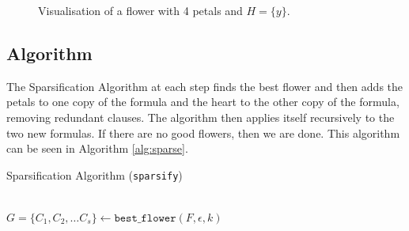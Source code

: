 \begin{figure}
    \centering
    \caption{Visualisation of a flower with 4 petals and $H = \{y\}$.}
    \label{fig:flower}
\end{figure}

\subsection{Algorithm}
The Sparsification Algorithm at each step finds the best flower and then adds
the petals to one copy of the formula and the heart to the other copy of the formula,
removing redundant clauses. The algorithm then applies itself recursively to the two
new formulas. If there are no good flowers, then we are done. This algorithm can
be seen in Algorithm \ref{alg:sparse}.

\begin{algorithm}
\caption{Sparsification Algorithm (\texttt{sparsify})}
\label{alg:sparse}
\vspace{5pt}
\hrulefill\\

\nl $G = \{C_1, C_2, \dots C_s\} \gets \texttt{best\_flower}(F, \epsilon, k)$ \\
\nl {}
\nl {}
\end{algorithm}

